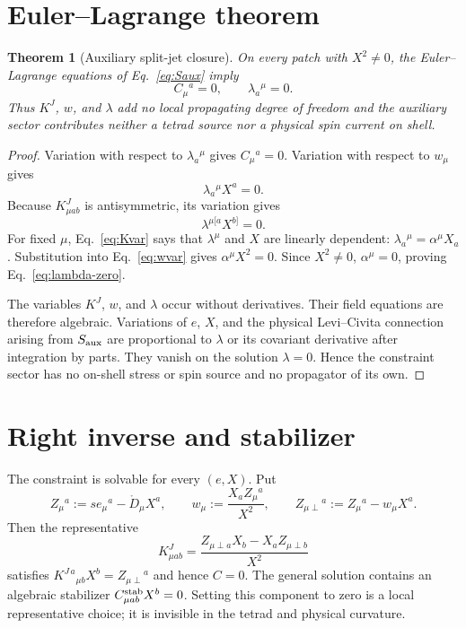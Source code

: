 \documentclass[11pt,a4paper]{article}
\newtheorem{theorem}{Theorem}
\begin{document}
\section{Euler--Lagrange theorem}
\begin{theorem}[Auxiliary split-jet closure]\label{thm:aux}
On every patch with $X^2\ne0$, the Euler--Lagrange equations of
Eq.~\eqref{eq:Saux} imply
\begin{equation}
 C_\mu{}^a=0,
 \qquad \lambda_a{}^\mu=0.
 \label{eq:lambda-zero}
\end{equation}
Thus $K^J$, $w$, and $\lambda$ add no local propagating degree of freedom and
the auxiliary sector contributes neither a tetrad source nor a physical spin
current on shell.
\end{theorem}

\begin{proof}
Variation with respect to $\lambda_a{}^\mu$ gives $C_\mu{}^a=0$.  Variation
with respect to $w_\mu$ gives
\begin{equation}
 \lambda_a{}^\mu X^a=0. \label{eq:wvar}
\end{equation}
Because $K^J_{\mu ab}$ is antisymmetric, its variation gives
\begin{equation}
 \lambda^{\mu[a}X^{b]}=0. \label{eq:Kvar}
\end{equation}
For fixed $\mu$, Eq.~\eqref{eq:Kvar} says that $\lambda^\mu$ and $X$ are
linearly dependent: $\lambda_a{}^\mu=\alpha^\mu X_a$.  Substitution into
Eq.~\eqref{eq:wvar} gives $\alpha^\mu X^2=0$.  Since $X^2\ne0$,
$\alpha^\mu=0$, proving Eq.~\eqref{eq:lambda-zero}.

The variables $K^J$, $w$, and $\lambda$ occur without derivatives.  Their
field equations are therefore algebraic.  Variations of $e$, $X$, and the
physical Levi--Civita connection arising from $S_{\rm aux}$ are proportional
to $\lambda$ or its covariant derivative after integration by parts.  They
vanish on the solution $\lambda=0$.  Hence the constraint sector has no
on-shell stress or spin source and no propagator of its own.
\end{proof}

\section{Right inverse and stabilizer}
The constraint is solvable for every $(e,X)$.  Put
\begin{equation}
 Z_\mu{}^a:=s e_\mu{}^a-\mathring D_\mu X^a,
 \qquad
 w_\mu:=\frac{X_aZ_\mu{}^a}{X^2},
 \qquad
 Z_{\mu\perp}{}^a:=Z_\mu{}^a-w_\mu X^a.
\end{equation}
Then the representative
\begin{equation}
 K^J_{\mu ab}
 =\frac{Z_{\mu\perp a}X_b-X_aZ_{\mu\perp b}}{X^2}
 \label{eq:Krep}
\end{equation}
satisfies $K^{J\,a}{}_{\mu b}X^b=Z_{\mu\perp}{}^a$ and hence $C=0$.
The general solution contains an algebraic stabilizer
$C_{\mu ab}^{\rm stab}X^b=0$.  Setting this component to zero is a local
representative choice; it is invisible in the tetrad and physical curvature.
\end{document}
